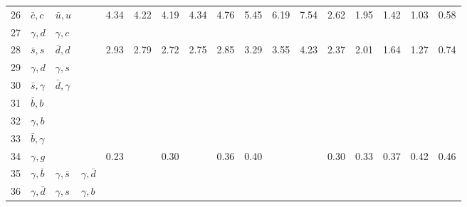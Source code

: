 \begin{tabularx}{\textwidth}{rXXX@{}S@{}S@{}S@{}S@{}S@{}S@{}S@{}S@{}S@{}S@{}S@{}S@{}S}
  26 & $\bar c,c$      & $\bar u, u$     &                 & 4.34 & 4.22 & 4.19 & 4.34 & 4.76 & 5.45 & 6.19 & 7.54 & 2.62 & 1.95 & 1.42 & 1.03 & 0.58 \\
  27 & $\gamma, d$     & $\gamma, c$     &                 &      &      &      &      &      &      &      &      &      &      &      &      &      \\
  28 & $\bar s,s$      & $\bar d, d$     &                 & 2.93 & 2.79 & 2.72 & 2.75 & 2.85 & 3.29 & 3.55 & 4.23 & 2.37 & 2.01 & 1.64 & 1.27 & 0.74 \\
  29 & $\gamma,d$      & $\gamma, s$     &                 &      &      &      &      &      &      &      &      &      &      &      &      &      \\
  30 & $\bar s,\gamma$ & $\bar d,\gamma$ &                 &      &      &      &      &      &      &      &      &      &      &      &      &      \\
  31 & $\bar b,b$      &                 &                 &      &      &      &      &      &      &      &      &      &      &      &      &      \\
  32 & $\gamma, b$     &                 &                 &      &      &      &      &      &      &      &      &      &      &      &      &      \\
  33 & $\bar b,\gamma$ &                 &                 &      &      &      &      &      &      &      &      &      &      &      &      &      \\
  34 & $\gamma,g$      &                 &                 & 0.23 &      & 0.30 &      & 0.36 & 0.40 &      &      & 0.30 & 0.33 & 0.37 & 0.42 & 0.46 \\
  35 & $\gamma,\bar b$ & $\gamma,\bar s$ & $\gamma,\bar d$ &      &      &      &      &      &      &      &      &      &      &      &      &      \\
  36 & $\gamma,\bar d$ & $\gamma,s$      & $\gamma,b$      &      &      &      &      &      &      &      &      &      &      &      &      &      \\
  \bottomrule
\end{tabularx}
